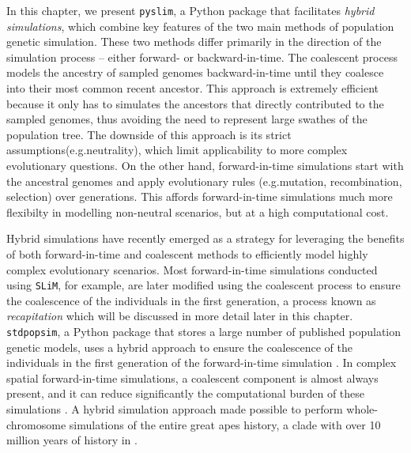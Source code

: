 \documentclass[12pt]{article}
\newcommand{\slim}[0]{\texttt{SLiM}\xspace}
\newcommand{\pyslim}[0]{\texttt{pyslim}\xspace}
\newcommand{\stdpopsim}[0]{\texttt{stdpopsim}\xspace}
\newcommand*{\eg}{e.g.\xcomma}
\begin{document}
In this chapter, we present \pyslim, a Python package that facilitates \emph{hybrid simulations},
which combine key features of the two main methods of population genetic simulation.
These two methods differ primarily in the direction of the simulation
process -- either forward- or backward-in-time. 
The coalescent process models the ancestry of sampled genomes
backward-in-time until they coalesce into their most common recent ancestor. %
This approach is extremely efficient because it only has to simulates the ancestors that directly contributed to the sampled genomes,
thus avoiding the need to represent large swathes of the population tree. 
The downside of this approach is its strict assumptions(\eg neutrality), 
which limit applicability to more complex evolutionary questions.
On the other hand, forward-in-time simulations start with the ancestral genomes and apply evolutionary rules (\eg mutation, recombination, selection) over generations.
This affords forward-in-time simulations much more flexibilty in modelling non-neutral scenarios, 
but at a high computational cost.

Hybrid simulations have recently emerged as a strategy for leveraging the benefits of both forward-in-time and coalescent methods
to efficiently model highly complex evolutionary scenarios.
Most forward-in-time simulations conducted using \slim, for example, are later modified using the coalescent process to ensure the coalescence of the individuals in the first generation, a process known as \emph{recapitation} which will be discussed in more detail later in this chapter.
\stdpopsim, a Python package that stores a large number of published population genetic models,
uses a hybrid approach to ensure the coalescence of the individuals in the first generation of the forward-in-time simulation \citep{adrion_community-maintained_2020,elise_expanding_nodate,gower_accessible_2025}.
In complex spatial forward-in-time simulations, a coalescent component is almost always present,
and it can reduce significantly the computational burden of these simulations \citep{battey_space_2020,petr_slendr_2023}.
A hybrid simulation approach made possible to perform whole-chromosome simulations of the entire great apes history, a clade with over 10 million years of history in \citet{rodrigues_shared_2024}.

\end{document}
